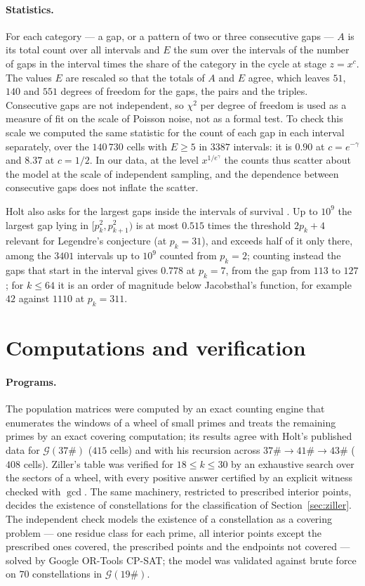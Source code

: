 \documentclass[11pt]{article}
\theoremstyle{definition}
\theoremstyle{remark}
\newcommand{\G}{\mathcal{G}}
\begin{document}
\paragraph{Statistics.} For each category --- a gap, or a pattern of two or three consecutive gaps --- $A$ is its total count over all intervals and $E$ the sum over the intervals of the number of gaps in the interval times the share of the category in the cycle at stage $z = x^c$. The values $E$ are rescaled so that the totals of $A$ and $E$ agree, which leaves $51$, $140$ and $551$ degrees of freedom for the gaps, the pairs and the triples. Consecutive gaps are not independent, so $\chi^2$ per degree of freedom is used as a measure of fit on the scale of Poisson noise, not as a formal test. To check this scale we computed the same statistic for the count of each gap in each interval separately, over the $140\,730$ cells with $E \ge 5$ in $3387$ intervals: it is $0.90$ at $c = e^{-\gamma}$ and $8.37$ at $c = 1/2$. In our data, at the level $x^{1/e^\gamma}$ the counts thus scatter about the model at the scale of independent sampling, and the dependence between consecutive gaps does not inflate the scatter.

Holt also asks for the largest gaps inside the intervals of survival \cite[\S4.1]{Ho26b}. Up to $10^9$ the largest gap lying in $[p_k^2, p_{k+1}^2)$ is at most $0.515$ times the threshold $2p_k + 4$ relevant for Legendre's conjecture (at $p_k = 31$), and exceeds half of it only there, among the $3401$ intervals up to $10^9$ counted from $p_k = 2$; counting instead the gaps that start in the interval gives $0.778$ at $p_k = 7$, from the gap from $113$ to $127$; for $k \le 64$ it is an order of magnitude below Jacobsthal's function, for example $42$ against $1110$ at $p_k = 311$.

\section{Computations and verification}\label{sec:verification}

\paragraph{Programs.} The population matrices were computed by an exact counting engine that enumerates the windows of a wheel of small primes and treats the remaining primes by an exact covering computation; its results agree with Holt's published data for $\G(37\#)$ ($415$ cells) and with his recursion across $37\# \to 41\# \to 43\#$ ($408$ cells). Ziller's table was verified for $18 \le k \le 30$ by an exhaustive search over the sectors of a wheel, with every positive answer certified by an explicit witness checked with $\gcd$. The same machinery, restricted to prescribed interior points, decides the existence of constellations for the classification of Section~\ref{sec:ziller}. The independent check models the existence of a constellation as a covering problem --- one residue class for each prime, all interior points except the prescribed ones covered, the prescribed points and the endpoints not covered --- solved by Google OR-Tools CP-SAT; the model was validated against brute force on $70$ constellations in $\G(19\#)$.
\end{document}
